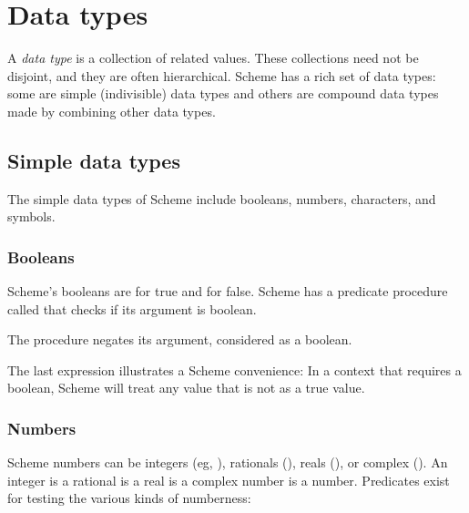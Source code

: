 \chapter{Data types}

A {\em data type} is a collection of related values.
These collections
need not be disjoint, and they are often hierarchical.
Scheme has a rich set of data types: some are simple
(indivisible) data types and others are compound data types
made by combining other data types.


\section{Simple data types}

The simple data types of Scheme include booleans, numbers,
characters, and symbols.



\subsection{Booleans}
\label{booleans}

Scheme's booleans are  for true and  for false.
Scheme has a predicate procedure called  that
checks if its argument is boolean.



\n The procedure  negates its argument, considered as a
boolean.


\n The last expression illustrates a Scheme convenience:
In a context that requires a boolean, Scheme will treat
any value that is not  as a true value.



\subsection{Numbers}

Scheme numbers can be integers (eg, ), rationals
(), reals (), or complex ().  An
integer is a rational is a real is a complex number is a
number.  Predicates exist for testing the various kinds of
numberness:

